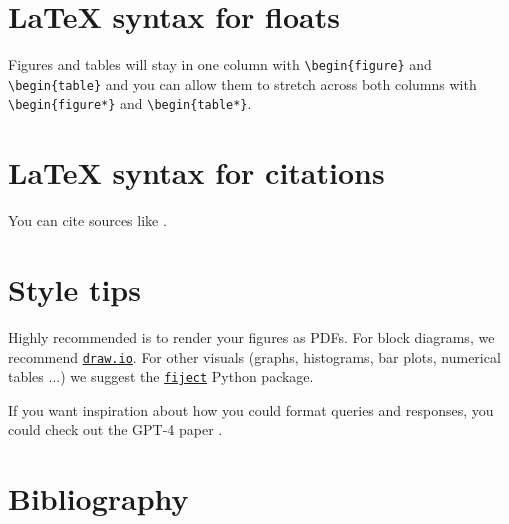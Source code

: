 \documentclass[a4paper,11pt]{article}
\begin{document}
\author{Jan Cichomski (r1026448)}

\twocolumn[\maketitle]


\section{\LaTeX{} syntax for floats}
Figures and tables will stay in one column with \verb|\begin{figure}| and \verb|\begin{table}| and you can allow them to stretch across both columns with \verb|\begin{figure*}| and \verb|\begin{table*}|.

\section{\LaTeX{} syntax for citations}
You can cite sources like \textcite{ouyang_training_2022}.

\section{Style tips}
Highly recommended is to render your figures as PDFs. For block diagrams, we recommend \href{https://draw.io}{\texttt{draw.io}}. For other visuals (graphs, histograms, bar plots, numerical tables ...) we suggest the \href{https://github.com/bauwenst/fiject}{\texttt{fiject}} Python package.

If you want inspiration about how you could format queries and responses, you could check out the GPT-4 paper \parencite{bubeck_sparks_2023}.


\newpage
\onecolumn
\appendix

\section*{Bibliography}
\printbibliography[heading=none]
\end{document}
